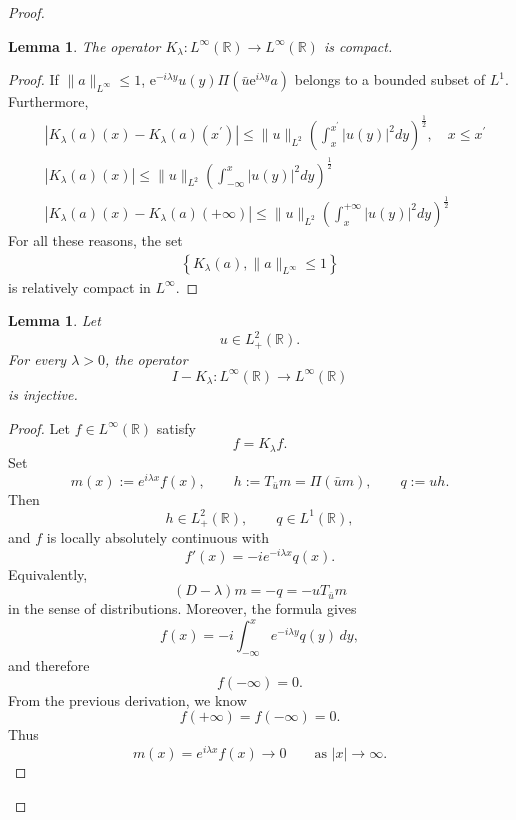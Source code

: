 \documentclass[10pt]{article}
\newtheorem{lemma}[theorem]{Lemma}
\numberwithin{equation}{section}
\numberwithin{theorem}{section}
\begin{document}
\begin{proof}
\begin{lemma}
The operator $K_\lambda: L^{\infty}(\mathbb{R}) \rightarrow L^{\infty}(\mathbb{R})$ is compact.
\end{lemma}
\begin{proof}
If $\|a\|_{L^{\infty}} \leq 1$, $\mathrm{e}^{-i \lambda y} u(y) \Pi\left(\bar{u} \mathrm{e}^{i \lambda y} a\right)$ belongs to a bounded subset of $L^1$. Furthermore,
\begin{equation}
\label{2.2}
\begin{aligned}
& \left|K_\lambda(a)(x)-K_\lambda(a)\left(x^{\prime}\right)\right| \leq\|u\|_{L^2}\left(\int_x^{x^{\prime}}|u(y)|^2 d y\right)^{\frac{1}{2}}, \quad x \leq x^{\prime} \\
& \left|K_\lambda(a)(x)\right| \leq\|u\|_{L^2}\left(\int_{-\infty}^x|u(y)|^2 d y\right)^{\frac{1}{2}} \\
& \left|K_\lambda(a)(x)-K_\lambda(a)(+\infty)\right| \leq\|u\|_{L^2}\left(\int_x^{+\infty}|u(y)|^2 d y\right)^{\frac{1}{2}}
\end{aligned}
\end{equation}
For all these reasons, the set
\begin{align*}
\left\{K_\lambda(a),\|a\|_{L^{\infty}} \leq 1\right\}
\end{align*}
is relatively compact in $L^{\infty}$.
\end{proof}
\begin{lemma}
\label{lemma 2.6}
Let
\[
u\in L^2_+(\mathbb R).
\]
For every \(\lambda>0\), the operator
\[
I-K_\lambda:L^\infty(\mathbb R)\to L^\infty(\mathbb R)
\]
is injective.
\end{lemma}

\begin{proof}
Let \(f\in L^\infty(\mathbb R)\) satisfy
\[
f=K_\lambda f.
\]
Set
\[
m(x):=e^{i\lambda x}f(x),
\qquad
h:=T_{\bar u}m=\Pi(\bar u m),
\qquad
q:=uh .
\]
Then
\[
h\in L^2_+(\mathbb R),
\qquad
q\in L^1(\mathbb R),
\]
and \(f\) is locally absolutely continuous with
\[
f'(x)=-i e^{-i\lambda x}q(x).
\]
Equivalently,
\[
(D-\lambda)m=-q=-uT_{\bar u}m
\]
in the sense of distributions. Moreover, the formula gives
\[
f(x)
=
-i\int_{-\infty}^x e^{-i\lambda y}q(y)\,dy,
\]
and therefore
\[
f(-\infty)=0.
\]
From the previous derivation, we know
\[
f(+\infty)= f(-\infty) =0.
\]
Thus
\[
m(x)=e^{i\lambda x}f(x)\to0
\qquad\text{as }|x|\to\infty .
\]


\end{proof}
\end{proof}
\end{document}
